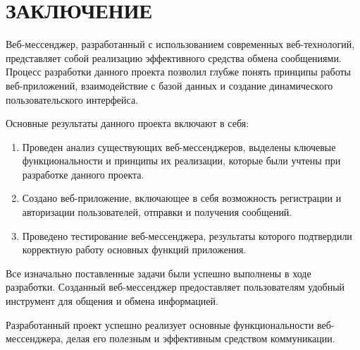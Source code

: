 \section*{ЗАКЛЮЧЕНИЕ}

Веб-мессенджер, разработанный с использованием современных веб-технологий, представляет собой реализацию эффективного средства обмена сообщениями. Процесс разработки данного проекта позволил глубже понять принципы работы веб-приложений, взаимодействие с базой данных и создание динамического пользовательского интерфейса.

Основные результаты данного проекта включают в себя:

\begin{enumerate}
	\item Проведен анализ существующих веб-мессенджеров, выделены ключевые функциональности и принципы их реализации, которые были учтены при разработке данного проекта.
	\item Создано веб-приложение, включающее в себя возможность регистрации и авторизации пользователей, отправки и получения сообщений.
	\item Проведено тестирование веб-мессенджера, результаты которого подтвердили корректную работу основных функций приложения.
\end{enumerate}

Все изначально поставленные задачи были успешно выполнены в ходе разработки. Созданный веб-мессенджер предоставляет пользователям удобный инструмент для общения и обмена информацией.

Разработанный проект успешно реализует основные функциональности веб-мессенджера, делая его полезным и эффективным средством коммуникации.
